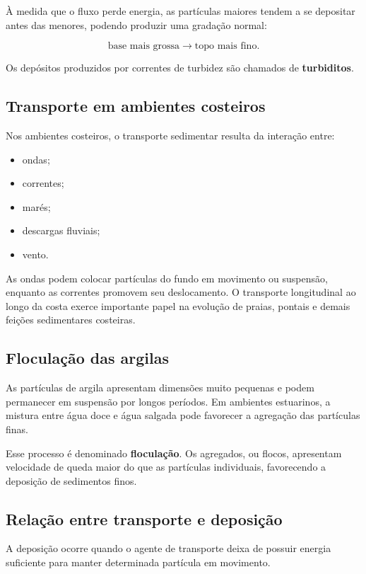 \documentclass[a4paper,12pt]{article}
\theoremstyle{definition}
\theoremstyle{definition}
\theoremstyle{definition}
\begin{document}
À medida que o fluxo perde energia, as partículas maiores tendem a se depositar
antes das menores, podendo produzir uma gradação normal:

\[
\text{base mais grossa}
\rightarrow
\text{topo mais fino}.
\]

Os depósitos produzidos por correntes de turbidez são chamados de
\textbf{turbiditos}.

\subsection{Transporte em ambientes costeiros}

Nos ambientes costeiros, o transporte sedimentar resulta da interação entre:

\begin{itemize}
    \item ondas;
    \item correntes;
    \item marés;
    \item descargas fluviais;
    \item vento.
\end{itemize}

As ondas podem colocar partículas do fundo em movimento ou suspensão, enquanto
as correntes promovem seu deslocamento. O transporte longitudinal ao longo da
costa exerce importante papel na evolução de praias, pontais e demais feições
sedimentares costeiras.

\subsection{Floculação das argilas}

As partículas de argila apresentam dimensões muito pequenas e podem permanecer
em suspensão por longos períodos. Em ambientes estuarinos, a mistura entre água
doce e água salgada pode favorecer a agregação das partículas finas.

Esse processo é denominado \textbf{floculação}. Os agregados, ou flocos,
apresentam velocidade de queda maior do que as partículas individuais,
favorecendo a deposição de sedimentos finos.

\subsection{Relação entre transporte e deposição}

A deposição ocorre quando o agente de transporte deixa de possuir energia
suficiente para manter determinada partícula em movimento.
\end{document}
